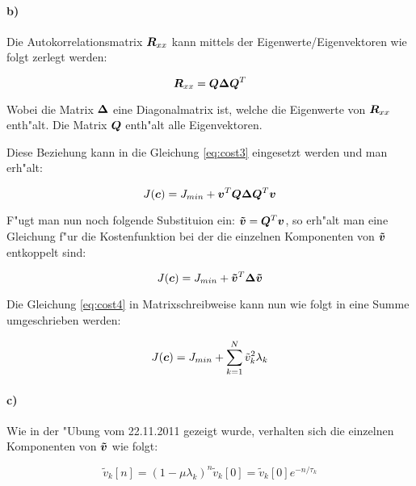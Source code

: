 \paragraph{b)}

Die Autokorrelationsmatrix $\bm{R}_{xx}$ kann mittels der Eigenwerte/Eigenvektoren wie folgt zerlegt werden:

\begin{equation}
\bm{R}_{xx} = \bm{Q}\bm{\Delta}\bm{Q}^T
\end{equation}

Wobei die Matrix $\bm{\Delta}$ eine Diagonalmatrix ist, welche die Eigenwerte von $\bm{R}_{xx}$ enth"alt.
Die Matrix $\bm{Q}$ enth"alt alle Eigenvektoren.

Diese Beziehung kann in die Gleichung \ref{eq:cost3} eingesetzt werden und man erh"alt:

\begin{equation}
 J(\bm{c}) = J_{min} + \bm{v}^T\bm{Q}\bm{\Delta}\bm{Q}^T\bm{v}
\label{eq:costasfd}
\end{equation}

F"ugt man nun noch folgende Substituion ein: $\bm{\tilde{v}} = \bm{Q}^T\bm{v}$, so erh"alt man
eine Gleichung f"ur die Kostenfunktion bei der die einzelnen Komponenten von $\bm{\tilde{v}}$ entkoppelt sind:

\begin{equation}
 J(\bm{c}) = J_{min} + \bm{\tilde{v}}^T\bm{\Delta}\bm{\tilde{v}}
\label{eq:cost4}
\end{equation}

Die Gleichung \ref{eq:cost4} in Matrixschreibweise kann nun wie folgt in eine Summe umgeschrieben werden:

\begin{equation}
 J(\bm{c}) = J_{min} + \sum_{k=1}^N \tilde{v}_k^2 \lambda_k
\label{eq:cost5}
\end{equation}

\paragraph{c)}

Wie in der "Ubung vom 22.11.2011 gezeigt wurde, verhalten sich die einzelnen Komponenten von $\bm{\tilde{v}}$
wie folgt:

\begin{equation}
 \tilde{v}_k[n] = (1-\mu \lambda_k)^n \tilde{v}_k[0] = \tilde{v}_k[0]e^{-n/\tau_k}
\label{eq:misalignment_evolution}
\end{equation}

